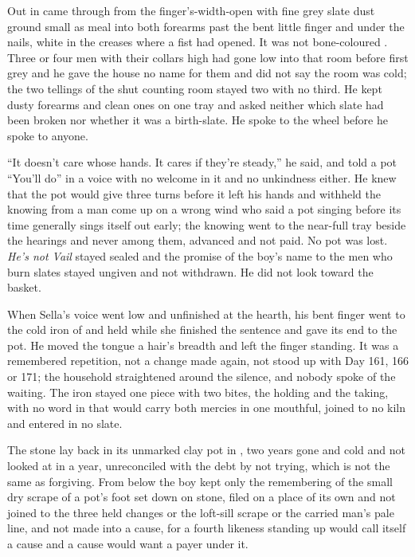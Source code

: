 \scenebreak

Out in   came through from the finger's-width-open  with fine grey slate dust ground small as meal into both forearms past the bent little finger and under the nails, white in the creases where a fist had opened. It was not bone-coloured . Three or four men with their collars high had gone low into that room before first grey and he gave the house no name for them and did not say the room was cold; the two tellings of the shut counting room stayed two with no third. He kept dusty forearms and clean ones on one tray and asked neither which slate had been broken nor whether it was a birth-slate. He spoke to the wheel before he spoke to anyone.

“It doesn't care whose hands. It cares if they're steady,” he said, and told a pot “You'll do” in a voice with no welcome in it and no unkindness either. He knew  that the pot would give three turns before it left his hands and withheld the knowing from a man come up on a wrong wind who said a pot singing before its time generally sings itself out early; the knowing went to the near-full tray beside the hearings and never among them, advanced and not paid. No pot was lost. \emph{He's not Vail} stayed sealed and the promise of the boy's name to the men who burn slates stayed ungiven and not withdrawn. He did not look toward the basket.

When Sella's voice went low and unfinished at the hearth, his bent finger went to the cold iron of  and held while she finished the sentence and gave its end to the pot. He moved the tongue a hair's breadth and left the finger standing. It was a remembered repetition, not a change made again, not stood up with Day 161, 166 or 171; the household straightened around the silence, and nobody spoke of the waiting. The iron stayed one piece with two bites, the holding and the taking, with no word in  that would carry both mercies in one mouthful, joined to no kiln and entered in no slate.

The stone lay back in its unmarked clay pot in , two years gone and cold and not looked at in a year, unreconciled with the debt by not trying, which is not the same as forgiving. From below the boy kept only the remembering of the small dry scrape of a pot's foot set down on stone, filed on a place of its own and not joined to the three held changes or the loft-sill scrape or the carried man's pale line, and not made into a cause, for a fourth likeness standing up would call itself a cause and a cause would want a payer under it.

